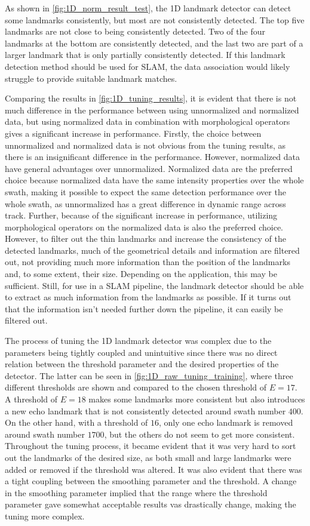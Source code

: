 As shown in \cref{fig:1D_norm_result_test}, the 1D landmark detector can detect some landmarks consistently, but most are not consistently detected. The top five landmarks are not close to being consistently detected. Two of the four landmarks at the bottom are consistently detected, and the last two are part of a larger landmark that is only partially consistently detected. If this landmark detection method should be used for SLAM, the data association would likely struggle to provide suitable landmark matches. 

Comparing the results in \cref{fig:1D_tuning_results}, it is evident that there is not much difference in the performance between using unnormalized and normalized data, but using normalized data in combination with morphological operators gives a significant increase in performance. Firstly, the choice between unnormalized and normalized data is not obvious from the tuning results, as there is an insignificant difference in the performance. However, normalized data have general advantages over unnormalized. Normalized data are the preferred choice because normalized data have the same intensity properties over the whole swath, making it possible to expect the same detection performance over the whole swath, as unnormalized has a great difference in dynamic range across track. Further, because of the significant increase in performance, utilizing morphological operators on the normalized data is also the preferred choice. However, to filter out the thin landmarks and increase the consistency of the detected landmarks, much of the geometrical details and information are filtered out, not providing much more information than the position of the landmarks and, to some extent, their size. Depending on the application, this may be sufficient. Still, for use in a SLAM pipeline, the landmark detector should be able to extract as much information from the landmarks as possible. If it turns out that the information isn't needed further down the pipeline, it can easily be filtered out. 

The process of tuning the 1D landmark detector was complex due to the parameters being tightly coupled and unintuitive since there was no direct relation between the threshold parameter and the desired properties of the detector. The latter can be seen in \cref{fig:1D_raw_tuning_training}, where three different thresholds are shown and compared to the chosen threshold of $E = 17$. A threshold of $E = 18$ makes some landmarks more consistent but also introduces a new echo landmark that is not consistently detected around swath number $400$. On the other hand, with a threshold of $16$, only one echo landmark is removed around swath number $1700$, but the others do not seem to get more consistent. Throughout the tuning process, it became evident that it was very hard to sort out the landmarks of the desired size, as both small and large landmarks were added or removed if the threshold was altered. It was also evident that there was a tight coupling between the smoothing parameter and the threshold. A change in the smoothing parameter implied that the range where the threshold parameter gave somewhat acceptable results vas drastically change, making the tuning more complex. 

